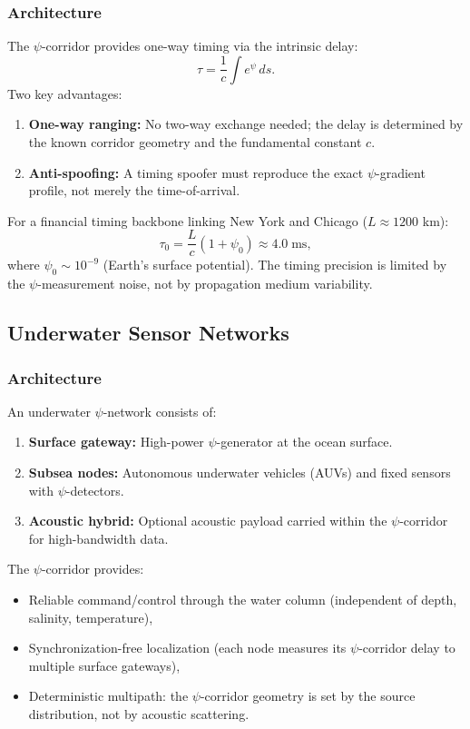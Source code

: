 \documentclass[twocolumn,superscriptaddress,prd,nofootinbib]{revtex4-2}
\begin{document}
\subsubsection{Architecture}

The $\psi$-corridor provides one-way timing via the intrinsic delay:
\begin{equation}
\tau = \frac{1}{c}\int e^\psi\,ds.
\end{equation}
Two key advantages:
\begin{enumerate}
\item \textbf{One-way ranging:} No two-way exchange needed; the delay
is determined by the known corridor geometry and the fundamental
constant $c$.
\item \textbf{Anti-spoofing:} A timing spoofer must reproduce the exact
$\psi$-gradient profile, not merely the time-of-arrival.
\end{enumerate}

For a financial timing backbone linking New York and Chicago
($L \approx 1200$ km):
\begin{equation}
\tau_0 = \frac{L}{c}(1 + \psi_0) \approx 4.0\;\text{ms},
\end{equation}
where $\psi_0 \sim 10^{-9}$ (Earth's surface potential).
The timing precision is limited by the $\psi$-measurement noise, not by
propagation medium variability.

\subsection{Underwater Sensor Networks}

\subsubsection{Architecture}

An underwater $\psi$-network consists of:
\begin{enumerate}
\item \textbf{Surface gateway:} High-power $\psi$-generator at the
ocean surface.
\item \textbf{Subsea nodes:} Autonomous underwater vehicles (AUVs) and
fixed sensors with $\psi$-detectors.
\item \textbf{Acoustic hybrid:} Optional acoustic payload carried within
the $\psi$-corridor for high-bandwidth data.
\end{enumerate}

The $\psi$-corridor provides:
\begin{itemize}
\item Reliable command/control through the water column (independent of
depth, salinity, temperature),
\item Synchronization-free localization (each node measures its
$\psi$-corridor delay to multiple surface gateways),
\item Deterministic multipath: the $\psi$-corridor geometry is set by
the source distribution, not by acoustic scattering.
\end{itemize}
\end{document}

